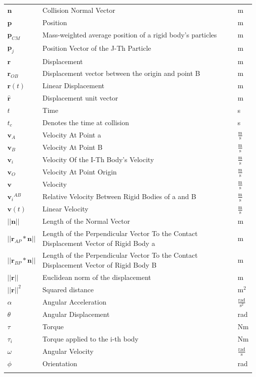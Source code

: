 \documentclass[12pt]{article}
\begin{document}
\begin{longtabu}{l X[l] l}
\\
$\mathbf{n}$ & Collision Normal Vector & m
\\
$\mathbf{p}$ & Position & m
\\
${\mathbf{p}_{CM}}$ & Mass-weighted average position of a rigid body's particles & m
\\
${\mathbf{p}_{j}}$ & Position Vector of the J-Th Particle & m
\\
$\mathbf{r}$ & Displacement & m
\\
${\mathbf{r}_{OB}}$ & Displacement vector between the origin and point B & m
\\
$\mathbf{r}(t)$ & Linear Displacement & m
\\
$\mathbf{\hat{r}}$ & Displacement unit vector & m
\\
$t$ & Time & s
\\
${t_{c}}$ & Denotes the time at collision & s
\\
${\mathbf{v}_{A}}$ & Velocity At Point a & $\frac{\text{m}}{\text{s}}$
\\
${\mathbf{v}_{B}}$ & Velocity At Point B & $\frac{\text{m}}{\text{s}}$
\\
${\mathbf{v}_{i}}$ & Velocity Of the I-Th Body's Velocity & $\frac{\text{m}}{\text{s}}$
\\
${\mathbf{v}_{O}}$ & Velocity At Point Origin & $\frac{\text{m}}{\text{s}}$
\\
$\mathbf{v}$ & Velocity & $\frac{\text{m}}{\text{s}}$
\\
${{\mathbf{v}_{i}}^{AB}}$ & Relative Velocity Between Rigid Bodies of a and B & $\frac{\text{m}}{\text{s}}$
\\
$\mathbf{v}(t)$ & Linear Velocity & $\frac{\text{m}}{\text{s}}$
\\
$||\mathbf{n}||$ & Length of the Normal Vector & m
\\
$||{\mathbf{r}_{AP}}*\mathbf{n}||$ & Length of the Perpendicular Vector To the Contact Displacement Vector of Rigid Body a & m
\\
$||{\mathbf{r}_{BP}}*\mathbf{n}||$ & Length of the Perpendicular Vector To the Contact Displacement Vector of Rigid Body B & m
\\
$||\mathbf{r}||$ & Euclidean norm of the displacement & m
\\
${||\mathbf{r}||^{2}}$ & Squared distance & $\text{m}^{2}$
\\
$α$ & Angular Acceleration & $\frac{\text{rad}}{\text{s}^{2}}$
\\
$θ$ & Angular Displacement & rad
\\
$τ$ & Torque & Nm
\\
${τ_{i}}$ & Torque applied to the i-th body & Nm
\\
$ω$ & Angular Velocity & $\frac{\text{rad}}{\text{s}}$
\\
$ϕ$ & Orientation & rad
\\
\bottomrule
\label{Table:ToS}
\end{longtabu}
\end{document}
